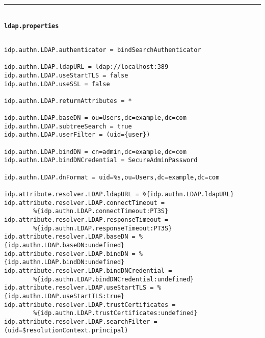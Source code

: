 \noindent\rule{14cm}{0.4pt}\\
\textbf{\texttt{ldap.properties}}
\begin{verbatim}

idp.authn.LDAP.authenticator = bindSearchAuthenticator

idp.authn.LDAP.ldapURL = ldap://localhost:389
idp.authn.LDAP.useStartTLS = false
idp.authn.LDAP.useSSL = false

idp.authn.LDAP.returnAttributes = *

idp.authn.LDAP.baseDN = ou=Users,dc=example,dc=com
idp.authn.LDAP.subtreeSearch = true
idp.authn.LDAP.userFilter = (uid={user})

idp.authn.LDAP.bindDN = cn=admin,dc=example,dc=com
idp.authn.LDAP.bindDNCredential = SecureAdminPassword

idp.authn.LDAP.dnFormat = uid=%s,ou=Users,dc=example,dc=com

idp.attribute.resolver.LDAP.ldapURL = %{idp.authn.LDAP.ldapURL}
idp.attribute.resolver.LDAP.connectTimeout = 
        %{idp.authn.LDAP.connectTimeout:PT3S}
idp.attribute.resolver.LDAP.responseTimeout = 
        %{idp.authn.LDAP.responseTimeout:PT3S}
idp.attribute.resolver.LDAP.baseDN = %{idp.authn.LDAP.baseDN:undefined}
idp.attribute.resolver.LDAP.bindDN = %{idp.authn.LDAP.bindDN:undefined}
idp.attribute.resolver.LDAP.bindDNCredential = 
        %{idp.authn.LDAP.bindDNCredential:undefined}
idp.attribute.resolver.LDAP.useStartTLS = %{idp.authn.LDAP.useStartTLS:true}
idp.attribute.resolver.LDAP.trustCertificates = 
        %{idp.authn.LDAP.trustCertificates:undefined}
idp.attribute.resolver.LDAP.searchFilter = (uid=$resolutionContext.principal)

\end{verbatim}